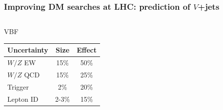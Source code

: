 \documentclass[aspectratio=169,xcolor=dvipsnames,,table,compress]{beamer}
\begin{document}
\begin{frame} \frametitle{Improving DM searches at LHC: prediction of $V$+jets}
  \vspace{-5mm}
    \begin{columns}[T]
    \begin{column}{0.33\textwidth}
      \centering
      VBF \\
      \begin{tabular}{l|c|c}
        Uncertainty & Size & Effect \\
        \hline \hline
        $W/Z$ EW & 15\% & 50\%\\
        $W/Z$ QCD & 15\% & 25\% \\
        \hline
        Trigger & 2\% & 20\% \\
        Lepton ID & 2-3\% & 15\% \\
      \end{tabular} \\


\end{column}
\end{columns}
\end{frame}
\end{document}
